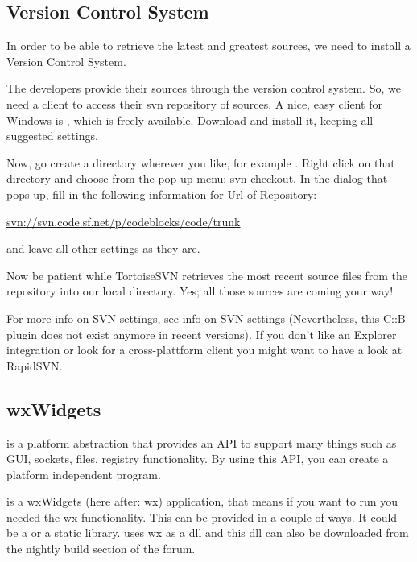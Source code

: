 \subsection{Version Control System}

In order to be able to retrieve the latest and greatest \codeblocks sources, we need to install a Version Control System.

The \codeblocks developers provide their sources through the version control system\cite{url:subversion}. So, we need a client to access their svn repository of sources. A nice, easy client for Windows is \cite{url:tortoisesvn}, which is freely available. Download and install it, keeping all suggested settings.

Now, go create a directory wherever you like, for example . Right click on that directory and choose from the pop-up menu: svn-checkout. In the dialog that pops up, fill in the following information for Url of Repository:

\url{svn://svn.code.sf.net/p/codeblocks/code/trunk}

and leave all other settings as they are.

Now be patient while TortoiseSVN retrieves the most recent source files from the \codeblocks repository into our local directory. Yes; all those \codeblocks sources are coming your way!

For more info on SVN settings, see info on SVN settings (Nevertheless, this C::B plugin does not exist anymore in recent \codeblocks versions). If you don't like an Explorer integration or look for a cross-plattform client you might want to have a look at RapidSVN.

\subsection{wxWidgets}

\cite{url:wx} is a platform abstraction that provides an API to support many things such as GUI, sockets, files, registry functionality. By using this API, you can create a platform independent program.

\codeblocks is a wxWidgets (here after: wx) application, that means if you want to run \codeblocks you needed the wx functionality. This can be provided in a couple of ways. It could be a  or a static library. \codeblocks uses wx as a dll and this dll can also be downloaded from the nightly build section of the forum.

